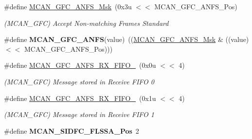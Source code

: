 \begin{DoxyCompactItemize}
\mbox{\label{group__SAMV71__MCAN_gaeda55c2a0d35e6d7e7ee9b7f74090180}} 
\#define \mbox{\hyperlink{group__SAMV71__MCAN_gaeda55c2a0d35e6d7e7ee9b7f74090180}{M\+C\+A\+N\+\_\+\+G\+F\+C\+\_\+\+A\+N\+F\+S\+\_\+\+Msk}}~(0x3u $<$$<$ M\+C\+A\+N\+\_\+\+G\+F\+C\+\_\+\+A\+N\+F\+S\+\_\+\+Pos)
\begin{DoxyCompactList}\small\item\em (M\+C\+A\+N\+\_\+\+G\+FC) Accept Non-\/matching Frames Standard \end{DoxyCompactList}\item 
\mbox{\label{group__SAMV71__MCAN_gad87166a921b0ab51e061307039e429ae}} 
\#define {\bfseries M\+C\+A\+N\+\_\+\+G\+F\+C\+\_\+\+A\+N\+FS}(value)~((\mbox{\hyperlink{group__SAMV71__MCAN_gaeda55c2a0d35e6d7e7ee9b7f74090180}{M\+C\+A\+N\+\_\+\+G\+F\+C\+\_\+\+A\+N\+F\+S\+\_\+\+Msk}} \& ((value) $<$$<$ M\+C\+A\+N\+\_\+\+G\+F\+C\+\_\+\+A\+N\+F\+S\+\_\+\+Pos)))
\item 
\mbox{\label{group__SAMV71__MCAN_gafdea21fd7aeb4be26407aa1e77c68d7b}} 
\#define \mbox{\hyperlink{group__SAMV71__MCAN_gafdea21fd7aeb4be26407aa1e77c68d7b}{M\+C\+A\+N\+\_\+\+G\+F\+C\+\_\+\+A\+N\+F\+S\+\_\+\+R\+X\+\_\+\+F\+I\+F\+O\+\_}}~(0x0u $<$$<$ 4)
\begin{DoxyCompactList}\small\item\em (M\+C\+A\+N\+\_\+\+G\+FC) Message stored in Receive F\+I\+FO 0 \end{DoxyCompactList}\item 
\mbox{\label{group__SAMV71__MCAN_gaa8cbd93941516a7c1da33e5f5063f312}} 
\#define \mbox{\hyperlink{group__SAMV71__MCAN_gaa8cbd93941516a7c1da33e5f5063f312}{M\+C\+A\+N\+\_\+\+G\+F\+C\+\_\+\+A\+N\+F\+S\+\_\+\+R\+X\+\_\+\+F\+I\+F\+O\+\_}}~(0x1u $<$$<$ 4)
\begin{DoxyCompactList}\small\item\em (M\+C\+A\+N\+\_\+\+G\+FC) Message stored in Receive F\+I\+FO 1 \end{DoxyCompactList}\item 
\mbox{\label{group__SAMV71__MCAN_ga06e7f367dc9ff3ed128b790b6f8b5af0}} 
\#define {\bfseries M\+C\+A\+N\+\_\+\+S\+I\+D\+F\+C\+\_\+\+F\+L\+S\+S\+A\+\_\+\+Pos}~2
\item 
\mbox{\label{group__SAMV71__MCAN_ga32274be4ecd43f1fc702770906fb00cb}} 

\end{DoxyCompactItemize}
